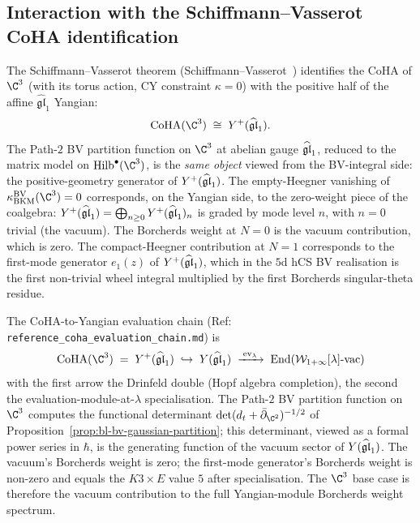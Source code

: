 \subsection*{Interaction with the Schiffmann--Vasserot CoHA identification}

\begin{remark}
\label{rem:bl-bv-c3-coha-side}
The Schiffmann--Vasserot theorem
(Schiffmann--Vasserot~\cite{SchiffmannVasserot2013}) identifies the
CoHA of $\C^3$ (with its torus action, CY constraint $\kappa = 0$)
with the positive half of the affine $\widehat{\mathfrak{gl}}_1$
Yangian:
\[
  \CoHA(\C^3) \;\cong\; Y^+(\ghat).
\]
The Path-$2$ BV partition function on $\C^3$ at abelian gauge
$\widehat{\mathfrak{gl}}_1$, reduced to the matrix model on $\Hilb^\bullet(\C^3)$, is
the \emph{same object} viewed from the BV-integral side: the
positive-geometry generator of $Y^+(\widehat{\mathfrak{gl}}_1)$. The empty-Heegner
vanishing of $\kBKM^{\mathrm{BV}}(\C^3) = 0$ corresponds, on the
Yangian side, to the zero-weight piece of the coalgebra:
$Y^+(\widehat{\mathfrak{gl}}_1) = \bigoplus_{n\geq 0} Y^+(\widehat{\mathfrak{gl}}_1)_n$ is graded by mode
level $n$, with $n = 0$ trivial (the vacuum). The Borcherds
weight at $N = 0$ is the vacuum contribution, which is zero. The
compact-Heegner contribution at $N = 1$ corresponds to the
first-mode generator $e_1(z)$ of
$Y^+(\widehat{\mathfrak{gl}}_1)$, which in the $5$d hCS BV realisation is the first
non-trivial wheel integral multiplied by the first Borcherds
singular-theta residue.
\end{remark}

\begin{remark}
\label{rem:bl-bv-c3-sv-base-case}
The CoHA-to-Yangian evaluation chain (Ref:
\texttt{reference\_coha\_evaluation\_chain.md}) is
\[
  \CoHA(\C^3) \;=\; Y^+(\ghat)
  \;\hookrightarrow\; Y(\ghat)
  \;\xrightarrow{\;\mathrm{ev}_\lambda\;}\;
  \mathrm{End}(\mathcal{W}_{1+\infty}[\lambda]\text{-vac})
\]
with the first arrow the Drinfeld double (Hopf algebra completion),
the second the evaluation-module-at-$\lambda$ specialisation.
The Path-$2$ BV partition function on $\C^3$ computes the
functional determinant $\det(d_t + \bar\partial_{\C^2})^{-1/2}$
of Proposition~\ref{prop:bl-bv-gaussian-partition}; this
determinant, viewed as a formal power series in $\hbar$, is the
generating function of the vacuum sector of $Y(\widehat{\mathfrak{gl}}_1)$. The
vacuum's Borcherds weight is zero; the first-mode generator's
Borcherds weight is non-zero and equals the $K3\times E$ value
$5$ after specialisation. The $\C^3$ base case is therefore the
vacuum contribution to the full Yangian-module Borcherds weight
spectrum.
\end{remark}

